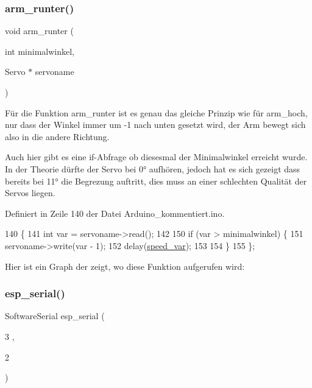 \subsubsection{\texorpdfstring{arm\+\_\+runter()}{arm\_runter()}}
{\footnotesize\ttfamily void arm\+\_\+runter (\begin{DoxyParamCaption}\item[{int}]{minimalwinkel,  }\item[{Servo $\ast$}]{servoname }\end{DoxyParamCaption})}



Für die Funktion arm\+\_\+runter ist es genau das gleiche Prinzip wie für arm\+\_\+hoch, nur dass der Winkel immer um -\/1 nach unten gesetzt wird, der Arm bewegt sich also in die andere Richtung. 

Auch hier gibt es eine if-\/\+Abfrage ob diesesmal der Minimalwinkel erreicht wurde. In der Theorie dürfte der Servo bei 0° aufhören, jedoch hat es sich gezeigt dass bereits bei 11° die Begrezung auftritt, dies muss an einer schlechten Qualität der Servos liegen.

Definiert in Zeile 140 der Datei Arduino\+\_\+kommentiert.\+ino.


\begin{DoxyCode}
140                                                       \{
141   \textcolor{keywordtype}{int} var = servoname->read();
142 
150   \textcolor{keywordflow}{if} (var > minimalwinkel) \{
151     servoname->write(var - 1);
152     delay(\hyperlink{_arduino__kommentiert_8ino_a8b03f5396d8e845086daab48dcaca5cb}{speed\_var});
153 
154   \}
155 \};
\end{DoxyCode}
Hier ist ein Graph der zeigt, wo diese Funktion aufgerufen wird\+:
\mbox{\label{_arduino__kommentiert_8ino_af690b3a6882292855c4091ede8039998}} 
\subsubsection{\texorpdfstring{esp\+\_\+serial()}{esp\_serial()}}
{\footnotesize\ttfamily Software\+Serial esp\+\_\+serial (\begin{DoxyParamCaption}\item[{3}]{,  }\item[{2}]{ }\end{DoxyParamCaption})}



